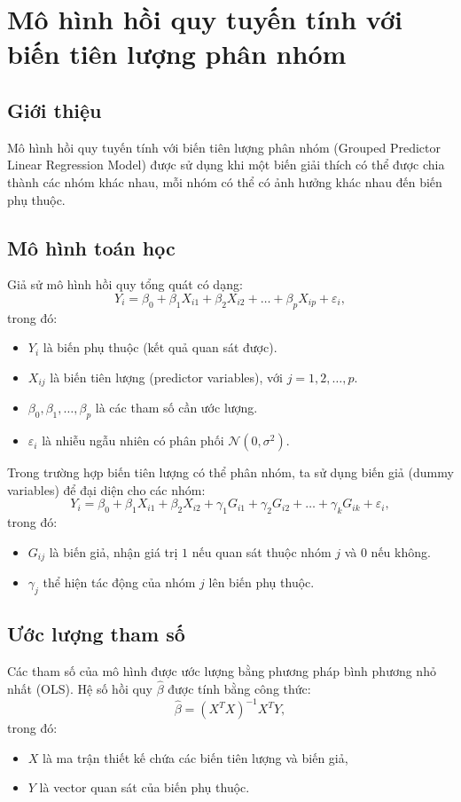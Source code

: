 \chapter{Mô hình hồi quy tuyến tính với biến tiên lượng phân nhóm}
\section{Giới thiệu}
Mô hình hồi quy tuyến tính với biến tiên lượng phân nhóm (Grouped Predictor Linear Regression Model) được sử dụng khi một biến giải thích có thể được chia thành các nhóm khác nhau, mỗi nhóm có thể có ảnh hưởng khác nhau đến biến phụ thuộc.

\section{Mô hình toán học}
Giả sử mô hình hồi quy tổng quát có dạng:
\begin{equation}
Y_i = \beta_0 + \beta_1 X_{i1} + \beta_2 X_{i2} + \dots + \beta_p X_{ip} + \varepsilon_i,
\end{equation}
trong đó:
\begin{itemize}
\item $Y_i$ là biến phụ thuộc (kết quả quan sát được).
\item $X_{ij}$ là biến tiên lượng (predictor variables), với $j = 1, 2, \dots, p$.
\item $\beta_0, \beta_1, \dots, \beta_p$ là các tham số cần ước lượng.
\item $\varepsilon_i$ là nhiễu ngẫu nhiên có phân phối $\mathcal{N}(0, \sigma^2)$.
\end{itemize}

Trong trường hợp biến tiên lượng có thể phân nhóm, ta sử dụng biến giả (dummy variables) để đại diện cho các nhóm:
\begin{equation}
Y_i = \beta_0 + \beta_1 X_{i1} + \beta_2 X_{i2} + \gamma_1 G_{i1} + \gamma_2 G_{i2} + \dots + \gamma_k G_{ik} + \varepsilon_i,
\end{equation}
trong đó:
\begin{itemize}
\item $G_{ij}$ là biến giả, nhận giá trị $1$ nếu quan sát thuộc nhóm $j$ và $0$ nếu không.
\item $\gamma_j$ thể hiện tác động của nhóm $j$ lên biến phụ thuộc.
\end{itemize}

\section{Ước lượng tham số}
Các tham số của mô hình được ước lượng bằng phương pháp bình phương nhỏ nhất (OLS). Hệ số hồi quy $\hat{\beta}$ được tính bằng công thức:
\begin{equation}
\hat{\beta} = (X^T X)^{-1} X^T Y,
\end{equation}
trong đó:
\begin{itemize}
\item $X$ là ma trận thiết kế chứa các biến tiên lượng và biến giả,
\item $Y$ là vector quan sát của biến phụ thuộc.
\end{itemize}

